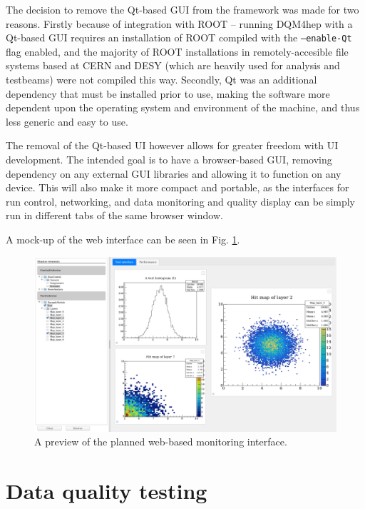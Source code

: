 The decision to remove the Qt-based GUI from the framework was made for two reasons. Firstly because of integration with ROOT -- running DQM4hep with a Qt-based GUI requires an installation of ROOT compiled with the \texttt{--enable-Qt} flag enabled, and the majority of ROOT installations in remotely-accesible file systems based at CERN and DESY (which are heavily used for analysis and testbeams) were not compiled this way. Secondly, Qt was an additional dependency that must be installed prior to use, making the software more dependent upon the operating system and environment of the machine, and thus less generic and easy to use.

The removal of the Qt-based UI however allows for greater freedom with UI development. The intended goal is to have a browser-based GUI, removing dependency on any external GUI libraries and allowing it to function on any device. This will also make it more compact and portable, as the interfaces for run control, networking, and data monitoring and quality display can be simply run in different tabs of the same browser window.

A mock-up of the web interface can be seen in Fig. \ref{figure:daq/dqm4hep/future-gui}.

\begin{figure}
	\centering
	\includegraphics[width=1.0\textwidth]{../Pictures/ScreenshotWebMonitoring.png}
	\caption{A preview of the planned web-based monitoring interface.}
	\label{figure:daq/dqm4hep/future-gui}
\end{figure}

\section{Data quality testing}


